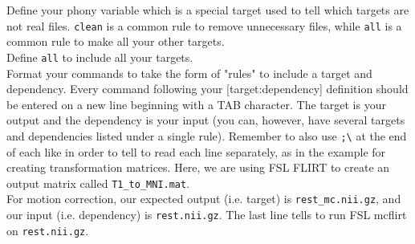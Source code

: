 \indent{}Define your phony variable which is a special target used to tell \maken{} which targets are not real files. \texttt{clean} is a common rule to remove unnecessary files, while \texttt{all} is a common rule to make all your other targets. \\
\indent{}Define \texttt{all} to include all your targets. \\
\indent{}Format your commands to take the form of "rules" to include a target and dependency. Every command following your [target:dependency] definition should be entered on a new line beginning with a TAB character. The target is your output and the dependency is your input (you can, however, have several targets and dependencies listed under a single rule). Remember to also use \texttt{;\textbackslash{}} at the end of each like in order to tell \maken{} to read each line separately, as in the example for creating transformation matrices. Here, we are using FSL FLIRT to create an output matrix called \texttt{T1_to_MNI.mat}. \\ 
\indent{}For motion correction, our expected output (i.e. target) is \texttt{rest_mc.nii.gz}, and our input (i.e. dependency) is \texttt{rest.nii.gz}. The last line tells \maken{} to run FSL mcflirt on \texttt{rest.nii.gz}. 

